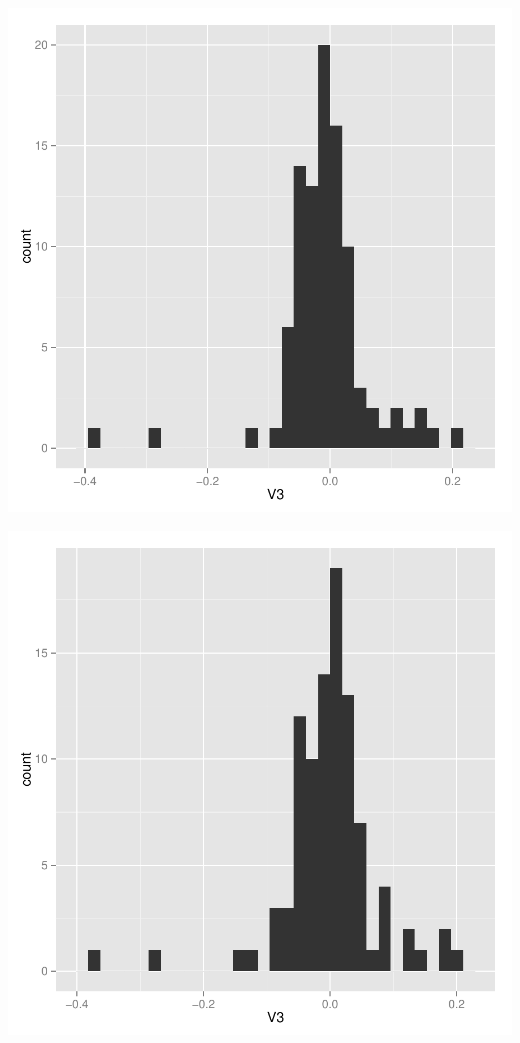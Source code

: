 \documentclass{article}
\begin{document}
\begin{center}
\includegraphics{Masterpiece-005}

\includegraphics{Masterpiece-006}


\end{center}
\end{document}
